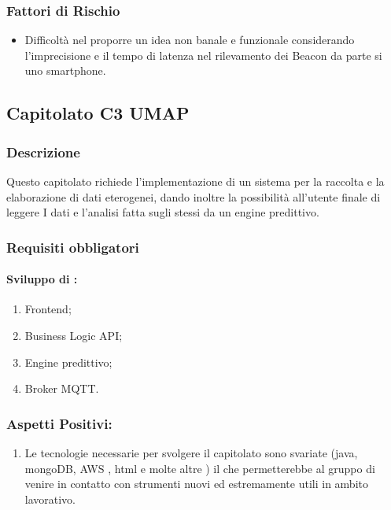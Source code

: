 \documentclass[12pt,a4paper]{article}
\begin{document}
\subsubsection{Fattori di Rischio}

\begin{itemize}
\item Difficoltà nel proporre un idea non banale e funzionale considerando l'imprecisione e il tempo di latenza nel rilevamento dei Beacon da parte si uno smartphone.
\end{itemize}

\newpage
\subsection{Capitolato C3 UMAP}
\subsubsection{Descrizione}

Questo capitolato richiede l'implementazione di un sistema per la  raccolta e la elaborazione di dati eterogenei, dando inoltre la possibilità all'utente finale di leggere I dati e l'analisi fatta sugli stessi da un engine predittivo.
\subsubsection{Requisiti obbligatori}  
\paragraph{Sviluppo di :}	
	\begin{enumerate}
	\item Frontend;
	\item Business Logic API; 
	\item Engine predittivo;
	\item Broker MQTT. 
	\end{enumerate}

\subsubsection{Aspetti Positivi:}
\begin{enumerate}
\item	Le tecnologie necessarie per svolgere il capitolato sono svariate (java, mongoDB, AWS , html e molte altre ) il che permetterebbe al gruppo di venire in contatto con strumenti nuovi ed estremamente utili in ambito lavorativo.
\end{enumerate}
\end{document}
